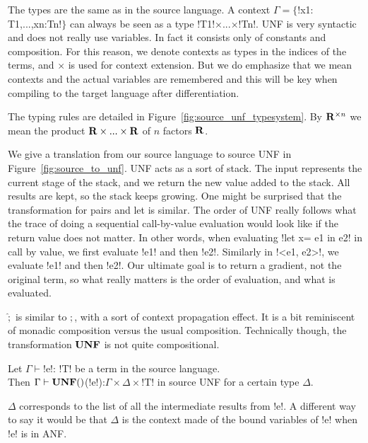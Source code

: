 The types are the same as in the source language. 
A context $\Gamma=\{$!x1: T1,...,xn:Tn!$\}$ can always be seen as a type !T1!$\times$...$\times$!Tn!.
UNF is very syntactic and does not really use variables. 
In fact it consists only of constants and composition. 
For this reason, we denote contexts as types in the indices of the terms, and $\times$ is used for context extension.
But we do emphasize that we mean contexts and the actual variables are remembered and
this will be key when compiling to the target language after differentiation. 

The typing rules are detailed in Figure~\ref{fig:source_unf_typesystem}.
By $\mathbf{R}^{\times n}$ we mean the product $\mathbf{R}\times...\times\mathbf{R}$ of $n$ factors $\mathbf{R}$.




We give a translation from our source language to source UNF in Figure~\ref{fig:source_to_unf}.
UNF acts as a sort of stack. 
The input represents the current stage of the stack, and we return the new value added to the stack.
All results are kept, so the stack keeps growing. One might be surprised that the transformation for pairs and let is similar.
The order of UNF really follows what the trace of doing a sequential call-by-value evaluation would look like if the return value does not matter.
In other words, when evaluating !let x= e1 in e2! in call by value, we first evaluate !e1! and then !e2!. 
Similarly in !<e1, e2>!, we evaluate !e1! and then !e2!. 
Our ultimate goal is to return a gradient, not the original term, so what really matters is the order of evaluation, and what is evaluated.

$\widehat{;}$ is similar to $;$, with a sort of context propagation effect. 
It is a bit reminiscent of monadic composition versus the usual composition.
Technically though, the transformation $\mathbf{UNF}$ is not quite compositional.

\begin{proposition}
    Let $\Gamma\vdash$!e!: !T! be a term in the source language.\\
    Then $\Gamma \vdash \UNF$(!e!):$\Gamma\times\Delta\times$!T! in source UNF for a certain type $\Delta$. 
\end{proposition}

$\Delta$ corresponds to the list of all the intermediate results from !e!. 
A different way to say it would be that $\Delta$ is the context made of the bound variables of !e! when !e! is in ANF.

